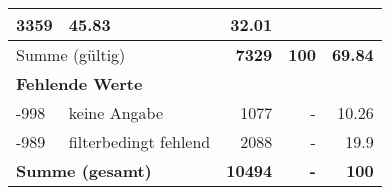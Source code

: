 \begin{longtable}{lXrrr}
       \num{3359} &
       \num[round-mode=places,round-precision=2]{45,83} &
         \num[round-mode=places,round-precision=2]{32,01} \\
     \midrule
     \multicolumn{2}{l}{Summe (gültig)} &
       \textbf{\num{7329}} &
     \textbf{100} &
       \textbf{\num[round-mode=places,round-precision=2]{69,84}} \\
     \multicolumn{5}{l}{\textbf{Fehlende Werte}}\\
       -998 &
       keine Angabe &
         \num{1077} &
        - &
         \num[round-mode=places,round-precision=2]{10,26} \\
       -989 &
       filterbedingt fehlend &
         \num{2088} &
        - &
         \num[round-mode=places,round-precision=2]{19,9} \\
     \midrule
     \multicolumn{2}{l}{\textbf{Summe (gesamt)}} &
          \textbf{\num{10494}} &
        \textbf{-} &
        \textbf{100} \\
     \bottomrule
     \end{longtable}
     
